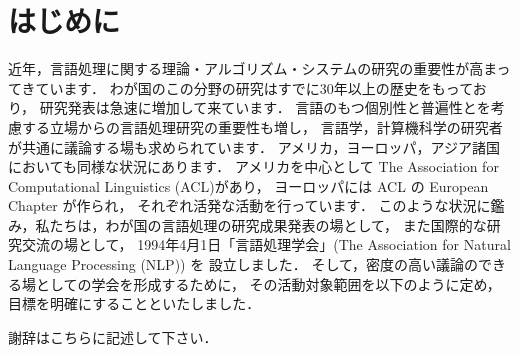 \documentclass[japanese,tombow,other]{jnlp_3.3}
\begin{document}
\maketitle


\section{はじめに}

近年，言語処理に関する理論・アルゴリズム・システムの研究の重要性が高まっ
てきています\cite{Article_01}．
わが国のこの分野の研究はすでに30年以上の歴史をもっており，
研究発表は急速に増加して来ています．
言語のもつ個別性と普遍性とを考慮する立場からの言語処理研究の重要性も増し，
言語学，計算機科学の研究者が共通に議論する場も求められています\cite{Book_02}．
アメリカ，ヨーロッパ，アジア諸国においても同様な状況にあります．
アメリカを中心として The Association for Computational Linguistics (ACL)があり，
ヨーロッパには ACL の European Chapter が作られ，
それぞれ活発な活動を行っています\cite{Inproc_03}．
このような状況に鑑み，私たちは，わが国の言語処理の研究成果発表の場として，
また国際的な研究交流の場として，
1994年4月1日「言語処理学会」(The Association for Natural Language Processing (NLP)) を
設立しました\cite{Masters_04,Techrep_05}．
そして，密度の高い議論のできる場としての学会を形成するために，
その活動対象範囲を以下のように定め，
目標を明確にすることといたしました\nocite{Web_06}．



\acknowledgment

謝辞はこちらに記述して下さい．






\begin{biography}

\end{biography}


\end{document}
